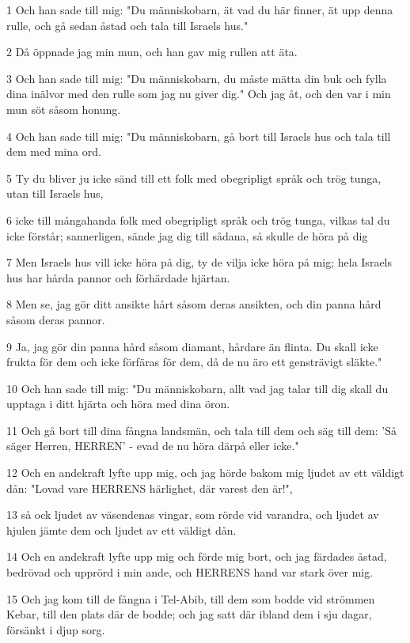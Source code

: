 \par 1 Och han sade till mig: "Du människobarn, ät vad du här finner, ät upp denna rulle, och gå sedan åstad och tala till Israels hus."
\par 2 Då öppnade jag min mun, och han gav mig rullen att äta.
\par 3 Och han sade till mig: "Du människobarn, du måste mätta din buk och fylla dina inälvor med den rulle som jag nu giver dig." Och jag åt, och den var i min mun söt såsom honung.
\par 4 Och han sade till mig: "Du människobarn, gå bort till Israels hus och tala till dem med mina ord.
\par 5 Ty du bliver ju icke sänd till ett folk med obegripligt språk och trög tunga, utan till Israels hus,
\par 6 icke till mångahanda folk med obegripligt språk och trög tunga, vilkas tal du icke förstår; sannerligen, sände jag dig till sådana, så skulle de höra på dig
\par 7 Men Israels hus vill icke höra på dig, ty de vilja icke höra på mig; hela Israels hus har hårda pannor och förhärdade hjärtan.
\par 8 Men se, jag gör ditt ansikte hårt såsom deras ansikten, och din panna hård såsom deras pannor.
\par 9 Ja, jag gör din panna hård såsom diamant, hårdare än flinta. Du skall icke frukta för dem och icke förfäras för dem, då de nu äro ett gensträvigt släkte."
\par 10 Och han sade till mig: "Du människobarn, allt vad jag talar till dig skall du upptaga i ditt hjärta och höra med dina öron.
\par 11 Och gå bort till dina fångna landsmän, och tala till dem och säg till dem: 'Så säger Herren, HERREN' - evad de nu höra därpå eller icke."
\par 12 Och en andekraft lyfte upp mig, och jag hörde bakom mig ljudet av ett väldigt dån: "Lovad vare HERRENS härlighet, där varest den är!",
\par 13 så ock ljudet av väsendenas vingar, som rörde vid varandra, och ljudet av hjulen jämte dem och ljudet av ett väldigt dån.
\par 14 Och en andekraft lyfte upp mig och förde mig bort, och jag färdades åstad, bedrövad och upprörd i min ande, och HERRENS hand var stark över mig.
\par 15 Och jag kom till de fångna i Tel-Abib, till dem som bodde vid strömmen Kebar, till den plats där de bodde; och jag satt där ibland dem i sju dagar, försänkt i djup sorg.
